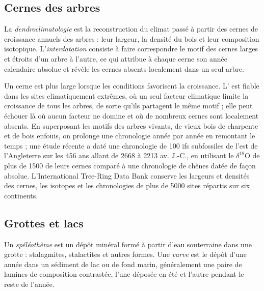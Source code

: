 \subsection*{Cernes des arbres}

\begin{definition}\label{def:b2:climate-proxies:dendro}
La \emph{dendroclimatologie} est la reconstruction du climat passé à partir des
cernes de croissance annuels des arbres : leur largeur, la densité du bois et leur composition
isotopique. L'\emph{interdatation} consiste à faire correspondre le motif des cernes larges et étroits
d'un arbre à l'autre, ce qui attribue à chaque cerne son année calendaire absolue et révèle les cernes
absents localement dans un seul arbre.
\end{definition}

Un cerne est plus large lorsque les conditions favorisent la croissance. L' est fiable dans les sites climatiquement extrêmes, où un seul facteur
climatique limite la croissance de tous les arbres, de sorte qu'ils partagent le même motif ; elle peut échouer là où aucun
facteur ne domine et où de nombreux cernes sont localement absents.
En superposant les motifs des arbres vivants, de vieux bois de charpente et de bois enfouis, on prolonge une chronologie
année par année en remontant le temps ; une étude récente a daté une chronologie de 100 ifs subfossiles de l'est de l'Angleterre
sur les 456 ans allant de 2668 à 2213 av. J.-C., en utilisant le $\delta^{18}$O de plus de \num{1500} de leurs cernes
comparé à une chronologie de chênes datée de façon absolue. L'International Tree-Ring Data Bank conserve les largeurs
et densités des cernes, les isotopes et les chronologies de plus de \num{5000} sites répartis sur six continents.

\subsection*{Grottes et lacs}

\begin{definition}\label{def:b2:climate-proxies:archives}
Un \emph{spéléothème} est un dépôt minéral formé à partir d'eau souterraine dans une
grotte : stalagmites, stalactites et autres formes. Une \emph{varve} est
le dépôt d'une année dans un sédiment de lac ou de fond marin, généralement une paire de lamines de composition
contrastée, l'une déposée en été et l'autre pendant le reste de l'année.
\end{definition}

